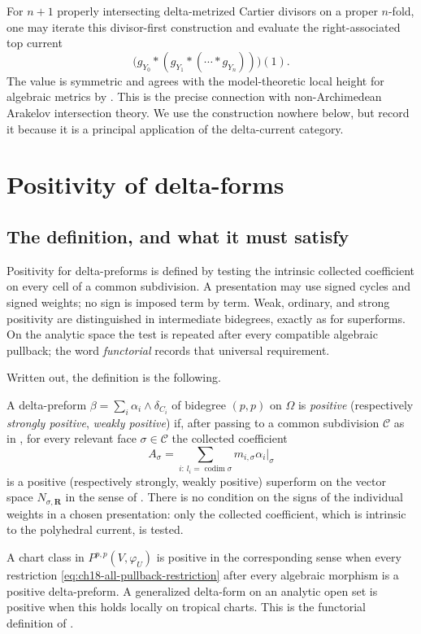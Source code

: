 For $n+1$ properly intersecting delta-metrized Cartier divisors on a proper
$n$-fold, one may iterate this divisor-first construction and evaluate the
right-associated top current
\[
       \bigl(g_{Y_0}*(g_{Y_1}*(\cdots*g_{Y_n}))\bigr)(1).
\]
The value is symmetric and agrees with the
model-theoretic local height for algebraic metrics by
\cite[Theorem~0.4 and \S12]{GK17}.  This is the precise connection with
non-Archimedean Arakelov intersection theory.  We use the construction
nowhere below, but record it because it is a principal application of the
delta-current category.

\section{Positivity of delta-forms}
\label{sec:delta-positivity}

\subsection{The definition, and what it must satisfy}
\label{sec:ch18-positivity-def}

Positivity for delta-preforms is defined by testing the intrinsic collected
coefficient on every cell of a common subdivision.  A presentation may use
signed cycles and signed weights; no sign is imposed term by term.  Weak,
ordinary, and strong positivity are distinguished in intermediate
bidegrees, exactly as for superforms.  On the analytic space the test is
repeated after every compatible algebraic pullback; the word
\emph{functorial} records that universal requirement.

Written out, the definition is the following.

\begin{definition}
\label{def:ch18-positive-delta}
%
A delta-preform $\beta=\sum_i\alpha_i\wedge\delta_{C_i}$ of bidegree $(p,p)$
on $\Omega$ is \emph{positive} (respectively \emph{strongly positive},
\emph{weakly positive}) if, after passing to a common subdivision
$\mathscr C$ as in , for every relevant face
$\sigma\in\mathscr C$ the collected coefficient
\[
 A_\sigma=\sum_{i:\,l_i=\operatorname{codim}\sigma}m_{i,\sigma}\alpha_i|_\sigma
\]
is a positive (respectively strongly, weakly positive) superform on the
vector space $N_{\sigma,\mathbf R}$ in the sense of
.  There is no condition on the signs of the
individual weights in a chosen presentation: only the collected coefficient,
which is intrinsic to the polyhedral current, is tested.

A chart class in $P^{p,p}(V,\varphi_U)$ is positive in the corresponding
sense when every restriction \eqref{eq:ch18-all-pullback-restriction} after
every algebraic morphism is a positive delta-preform.  A generalized
delta-form on an analytic open set is positive when this holds locally on
tropical charts.  This is the functorial definition of
\cite[Definitions~2.2 and 2.6]{GK19}.
\end{definition}

